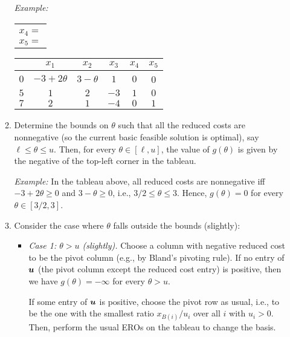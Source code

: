 \begin{enumerate}
\begin{enumerate}[label={(\arabic*)}]
\emph{Example:}
\begin{center}
\begin{tabular}{c}
\vspace{0.7cm} \\
\(x_{4}=\) \\
\(x_5=\) \\
\end{tabular}
\begin{tabular}{cccccc}
&\(x_1\)&\(x_2\)&\(x_3\)&\(x_4\)&\(x_5\) \\
\toprule
\(0\)&\(-3+2\theta\)&\(3-\theta\)&\(1\)&\(0\)&0\\
\midrule
\(5\)&\(1\)&\(2\)&\(-3\)&\(1\)&\(0\) \\
\(7\)&\(2\)&\(1\)&\(-4\)&\(0\)&\(1\) \\
\bottomrule
\end{tabular}
\end{center}
\item Determine the bounds on \(\theta\) such that all the reduced costs are
nonnegative (so the current basic feasible solution is optimal), say \(\ell\le
\theta\le u\). Then, for every \(\theta\in [\ell,u]\), the value of
\(g(\theta)\) is given by the negative of the top-left corner in the tableau.

\emph{Example:} In the tableau above, all reduced costs are nonnegative iff
\(-3+2\theta\ge 0\) and \(3-\theta\ge 0\), i.e., \(3/2\le\theta\le 3\). Hence,
\(g(\theta)=0\) for every \(\theta\in[3/2,3]\).
\item Consider the case where \(\theta\) falls outside the bounds (slightly):
\begin{itemize}
\item \emph{Case 1: \(\theta>u\) (slightly).} Choose a column with negative
reduced cost to be the pivot column (e.g., by Bland's pivoting rule).  If no
entry of \(\bm{u}\) (the pivot column except the reduced cost entry) is
positive, then we have \(g(\theta)=-\infty\) for every \(\theta>u\).

If some entry of \(\bm{u}\) is positive, choose the pivot row as usual,
i.e., to be the one with the smallest ratio \(x_{B(i)}/u_i\) over all \(i\)
with \(u_i>0\). Then, perform the usual EROs on the tableau to change the basis.



\end{itemize}
\end{enumerate}
\end{enumerate}
